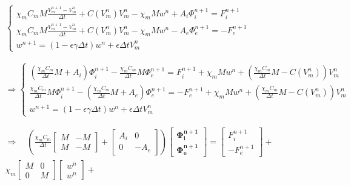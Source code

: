 \documentclass[a4paper]{article}
\theoremstyle{definition}
\begin{document}
\begin{equation}
\begin{gathered}
\begin{cases}
\chi_m C_m M\frac{V_m^{n+1} - V_m^n}{\Delta t} + C(V_m^n)V_m^n -\chi_mMw^n + A_i \Phi_i^{n+1}= F_i^{n+1} \\
\chi_m C_m M\frac{V_m^{n+1} - V_m^n}{\Delta t} + C(V_m^n)V_m^n -\chi_mMw^n - A_e \Phi_e^{n+1}= -F_e^{n+1} \\
w^{n+1} = (1-\epsilon \gamma \Delta t) w^n + \epsilon \Delta t V_m^n
\end{cases}
\\ \\  \\
\Rightarrow
\begin{cases}
\left( \frac{\chi_m C_m}{\Delta t} M + A_i \right ) \Phi_i^{n+1} - \frac{\chi_m C_m}{\Delta t} M \Phi_e^{n+1} = F_i^{n+1} + \chi_m M w^n + \left( \frac{\chi_m C_m}{\Delta t} M- C(V_m^n)\right) V_m^n \\ 
\frac{\chi_m C_m}{\Delta t} M  \Phi_i^{n+1} - \left(\frac{\chi_m C_m}{\Delta t} M + A_e \right) \Phi_e^{n+1} =  -F_e^{n+1} + \chi_m M w^n + \left( \frac{\chi_m C_m}{\Delta t} M- C(V_m^n)\right) V_m^n \\
w^{n+1} = (1-\epsilon \gamma \Delta t) w^n + \epsilon \Delta tV_m^n
\end{cases}
\\\\\\ \Rightarrow \quad
\left(
	\frac{\chi_m C_m}{\Delta t} \begin{bmatrix}M & -M \\ M & -M\end{bmatrix}
	+ \begin{bmatrix} A_i & 0 \\ 0 & -A_e \end{bmatrix}
	\right) \begin{bmatrix} \bm{\Phi_i^{n+1}} \\ \bm{\Phi_e^{n+1}}  \end{bmatrix} =
	\begin{bmatrix} F_i^{n+1} \\ -F_e^{n+1} \end{bmatrix} + \\
	\chi_m\begin{bmatrix} M & 0 \\ 0 & M \end{bmatrix} \begin{bmatrix} w^n \\ w^n \end{bmatrix} +

\end{gathered}
\end{equation}
\end{document}
